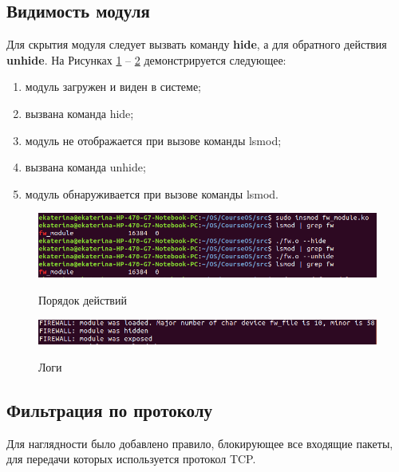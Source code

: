 \subsection{Видимость модуля}
Для скрытия модуля следует вызвать команду \textbf{hide}, а для обратного действия \textbf{unhide}. На Рисунках \ref{fig40:image} -- \ref{fig41:image} демонстрируется следующее:
\begin{enumerate}
	\item модуль загружен и виден в системе;
	
	\item вызвана команда hide;
	
	\item модуль не отображается при вызове команды lsmod;
	
	\item вызвана команда unhide;
	
	\item модуль обнаруживается при вызове команды lsmod.
\end{enumerate}

\begin{figure}[h]
	\begin{center}
		{\includegraphics[scale = 0.6]{img/screenshots/hide_unhide/hide_comm.png}}
		\caption{Порядок действий}
		\label{fig40:image}
	\end{center}
\end{figure}

\begin{figure}[h]
	\begin{center}
		{\includegraphics[scale = 0.7]{img/screenshots/hide_unhide/hide_result.png}}
		\caption{Логи}
		\label{fig41:image}
	\end{center}
\end{figure}

\subsection{Фильтрация по протоколу}
Для наглядности было добавлено правило, блокирующее все входящие пакеты, для передачи которых используется протокол TCP.

